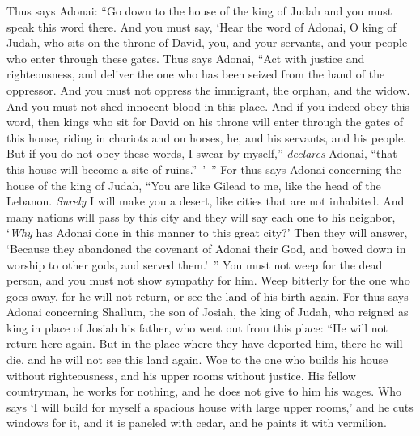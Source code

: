 \begin{biblechapter} %
\verse Thus says Adonai: “Go down to the house of the king of Judah and you must speak this word there.
\verse And you must say, ‘Hear the word of Adonai, O king of Judah, who sits on the throne of David, you, and your servants, and your people who enter through these gates.
\verse Thus says Adonai, “Act with justice and righteousness, and deliver the one who has been seized from the hand of the oppressor. And you must not oppress the immigrant, the orphan, and the widow. And you must not shed innocent blood in this place.
\verse And if you indeed obey this word, then kings who sit for David on his throne will enter through the gates of this house, riding in chariots and on horses, he, and his servants, and his people.
\verse But if you do not obey these words, I swear by myself,” \textit{declares} Adonai, “that this house will become a site of ruins.” ’ ”
\verse For thus says Adonai concerning the house of the king of Judah,
\verse “You are like Gilead to me, 
like the head of the Lebanon. 
\textit{Surely} I will make you a desert, 
like cities that are not inhabited.
\verse And many nations will pass by this city and they will say each one to his neighbor, ‘\textit{Why} has Adonai done in this manner to this great city?’
\verse Then they will answer, ‘Because they abandoned the covenant of Adonai their God, and bowed down in worship to other gods, and served them.’ ”
\verse You must not weep for the dead person, 
and you must not show sympathy for him. 
Weep bitterly for the one who goes away, 
for he will not return, or see the land of his birth again.
\verse For thus says Adonai concerning Shallum, the son of Josiah, the king of Judah, who reigned as king in place of Josiah his father, who went out from this place: “He will not return here again.
\verse But in the place where they have deported him, there he will die, and he will not see this land again.
\verse Woe to the one who builds his house without righteousness, 
and his upper rooms without justice. 
His fellow countryman, he works for nothing, 
and he does not give to him his wages.
\verse Who says ‘I will build for myself 
a spacious house with large upper rooms,’ 
and he cuts windows for it, 
and it is paneled with cedar, 
and he paints it with vermilion.

\end{biblechapter}
